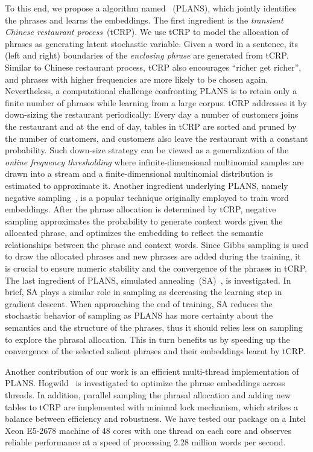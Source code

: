 To this end, we propose a algorithm named \PLANS~(PLANS), which jointly
identifies the phrases and learns the embeddings. The first ingredient is the
\emph{transient Chinese restaurant process}~(tCRP). We use tCRP to model the
allocation of phrases as generating latent stochastic variable. Given a word in
a sentence, its (left and right) boundaries of the \emph{enclosing phrase} are
generated from tCRP. Similar to Chinese restaurant process, tCRP also encourages
``richer get richer'', and phrases with higher frequencies are more likely to be
chosen again. Nevertheless, a computational challenge confronting PLANS is to
retain only a finite number of phrases while learning from a large corpus. tCRP
addresses it by down-sizing the restaurant periodically: Every day a number of
customers joins the restaurant and at the end of day, tables in tCRP are sorted
and pruned by the number of customers, and customers also leave the restaurant
with a constant probability. Such down-size strategy can be viewed as a
generalization of the \emph{online frequency thresholding} where
infinite-dimensional multinomial samples are drawn into a stream and a
finite-dimensional multinomial distribution is estimated to approximate it.
Another ingredient underlying PLANS, namely negative
sampling~\cite{mikolov2013efficient}, is a popular technique originally employed
to train word embeddings. After the phrase allocation is determined by tCRP,
negative sampling approximates the probability to generate context words given
the allocated phrase, and optimizes the embedding to reflect the semantic
relationships between the phrase and context words. Since Gibbs sampling is used
to draw the allocated phrases and new phrases are added during the training, it
is crucial to ensure numeric stability and the convergence of the phrases in
tCRP. The last ingredient of PLANS, simulated
annealing~(SA)~\cite{aarts1988simulated,brooks1995optimization}, is
investigated. In brief, SA plays a similar role in sampling as decreasing the
learning step in gradient descent. When approaching the end of training, SA
reduces the stochastic behavior of sampling as PLANS has more certainty about
the semantics and the structure of the phrases, thus it should relies less on
sampling to explore the phrasal allocation. This in turn benefits us by speeding
up the convergence of the selected salient phrases and their embeddings learnt
by tCRP.

Another contribution of our work is an efficient multi-thread implementation of
PLANS. Hogwild~\cite{recht2011hogwild} is investigated to optimize the phrase
embeddings across threads. In addition, parallel sampling the phrasal allocation
and adding new tables to tCRP are implemented with minimal lock mechanism, which
strikes a balance between efficiency and robustness. We have tested our package
on a Intel Xeon E5-2678 machine of 48 cores with one thread on each core and
observes reliable performance at a speed of processing 2.28 million words per
second.

